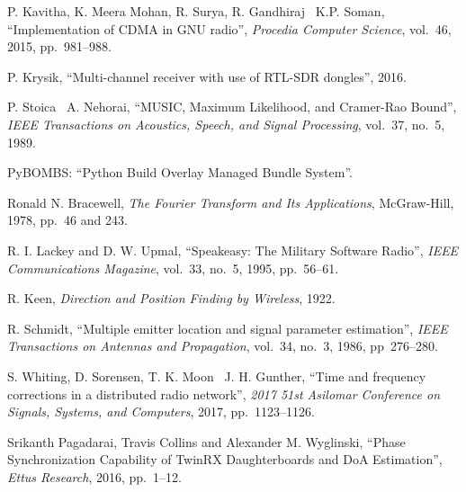 \documentclass[a4paper,12pt,oneside]{book}%
\begin{document}
\begin{thebibliography}{xx}
	P. Kavitha, K. Meera Mohan, R. Surya, R. Gandhiraj \harvardand\ K.P. Soman, {``Implementation of CDMA in GNU radio''}, {\em Procedia Computer Science}, vol.~46, 2015, pp.~981--988.
	
	P. Krysik, ``{Multi-channel receiver with use of RTL-SDR dongles}'', 2016.
	
	P. Stoica \harvardand\ A. Nehorai,
	``{MUSIC, Maximum Likelihood, and Cramer-Rao Bound}'', {\em IEEE Transactions
		on Acoustics, Speech, and Signal Processing}, {vol.~37}, no.~5, 1989.
	
	PyBOMBS: ``Python Build Overlay Managed Bundle System''.
	
	Ronald N. Bracewell, {\em {The Fourier Transform and Its Applications}}, McGraw-Hill, 1978, pp.~46 and 243.
	
	{R. I. Lackey and D. W. Upmal},
	``{Speakeasy: The Military Software Radio}'', {\em IEEE Communications
		Magazine}, {vol.~33}, no.~5, 1995, pp.~56--61.
	
	R. Keen, {\em {Direction and Position Finding by Wireless}}, 1922.
	
	R. Schmidt, ``{Multiple emitter
		location and signal parameter estimation}'', {\em IEEE Transactions on Antennas and Propagation}, vol.~34, no.~3, 1986, pp~276--280.
	
	S. Whiting, D. Sorensen, T. K. Moon \harvardand\ J. H. Gunther,
	 ``{Time and frequency corrections in
		a distributed radio network}'', {\em 2017 51st Asilomar Conference on Signals, Systems, and Computers}, 2017, pp.~1123--1126.
	
	 Srikanth Pagadarai, Travis Collins and Alexander M. Wyglinski, ``{Phase
		Synchronization Capability of TwinRX Daughterboards and DoA Estimation}'', {\em Ettus Research}, 2016, pp.~1--12.
	
\end{thebibliography}
\end{document}
